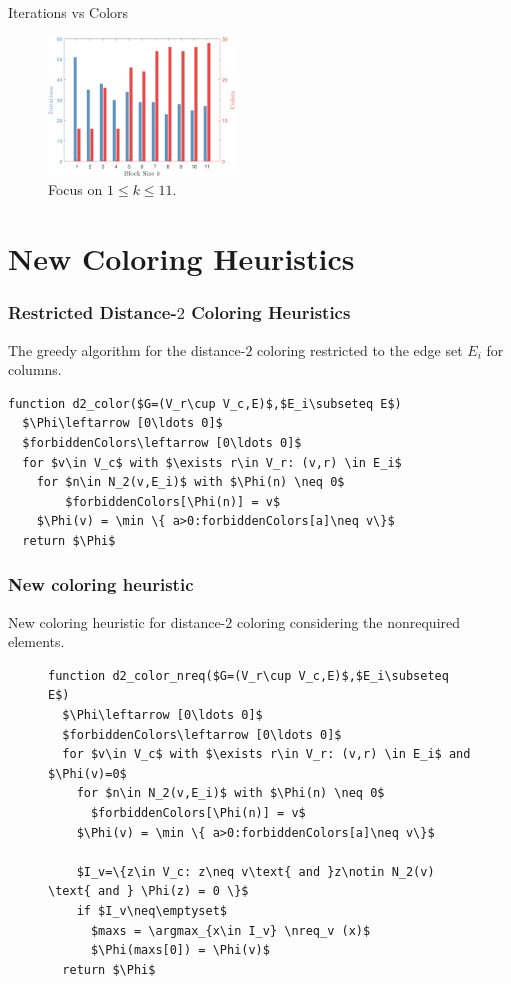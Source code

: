 \documentclass{beamer}
\DeclareMathOperator*{\argmax}{arg\,max}
\newcommand{\nreq}{L}
\begin{document}
\begin{frame}{Iterations vs Colors}
\begin{figure}
\centering
\includegraphics[width=0.44\textwidth]{zoom_iterations_colors}
\caption{Focus on $1 \leq k \leq 11$.}
\label{f:zoom_iterations_colors}
\end{figure}
\end{frame}

\section{New Coloring Heuristics}
\begin{frame}[fragile]
\frametitle{Restricted Distance-$2$ Coloring Heuristics}
The greedy algorithm for
the distance-$2$ coloring restricted to the edge set $E_i$
for columns.
\begin{lstlisting}[mathescape]
function d2_color($G=(V_r\cup V_c,E)$,$E_i\subseteq E$)
  $\Phi\leftarrow [0\ldots 0]$
  $forbiddenColors\leftarrow [0\ldots 0]$
  for $v\in V_c$ with $\exists r\in V_r: (v,r) \in E_i$
    for $n\in N_2(v,E_i)$ with $\Phi(n) \neq 0$
        $forbiddenColors[\Phi(n)] = v$
    $\Phi(v) = \min \{ a>0:forbiddenColors[a]\neq v\}$
  return $\Phi$
\end{lstlisting}
\end{frame}
\begin{frame}[fragile]
\frametitle{New coloring heuristic}
New coloring heuristic for distance-$2$ coloring
considering the nonrequired elements.
\begin{figure}
\begin{lstlisting}[mathescape]
function d2_color_nreq($G=(V_r\cup V_c,E)$,$E_i\subseteq E$)
  $\Phi\leftarrow [0\ldots 0]$
  $forbiddenColors\leftarrow [0\ldots 0]$
  for $v\in V_c$ with $\exists r\in V_r: (v,r) \in E_i$ and $\Phi(v)=0$
    for $n\in N_2(v,E_i)$ with $\Phi(n) \neq 0$
      $forbiddenColors[\Phi(n)] = v$
    $\Phi(v) = \min \{ a>0:forbiddenColors[a]\neq v\}$

    $I_v=\{z\in V_c: z\neq v\text{ and }z\notin N_2(v) \text{ and } \Phi(z) = 0 \}$
    if $I_v\neq\emptyset$
      $maxs = \argmax_{x\in I_v} \nreq_v (x)$
      $\Phi(maxs[0]) = \Phi(v)$
  return $\Phi$
\end{lstlisting}
\end{figure}
\end{frame}
\end{document}
